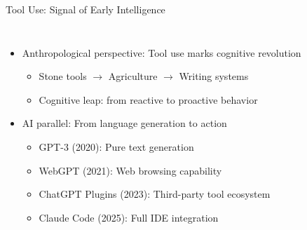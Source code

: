 \documentclass[aspectratio=169]{beamer}
\begin{document}
\begin{frame}{Tool Use: Signal of Early Intelligence}
	\begin{columns}
		\column{\textwidth}
		\begin{itemize}
			\item {\color{highlight}Anthropological perspective}: Tool use marks cognitive revolution
			\begin{itemize}
				\item Stone tools $\rightarrow$ Agriculture $\rightarrow$ Writing systems
				\item Cognitive leap: from reactive to proactive behavior
			\end{itemize}
			\item {\color{highlight}AI parallel}: From language generation to action
			\begin{itemize}
				\item GPT-3 (2020): Pure text generation
				\item WebGPT (2021): Web browsing capability
				\item ChatGPT Plugins (2023): Third-party tool ecosystem
				\item Claude Code (2025): Full IDE integration
			\end{itemize}
		\end{itemize}
	\end{columns}
\end{frame}
\end{document}
